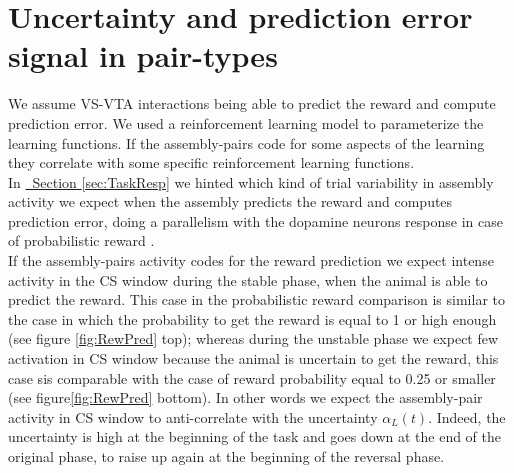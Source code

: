 \section{Uncertainty and prediction error signal in pair-types}
\label{sec:CorrRL}
We assume VS-VTA interactions being able to predict the reward and compute prediction error. We used a reinforcement learning model to parameterize the learning functions. If the assembly-pairs code for some aspects of the learning they correlate with some specific reinforcement learning functions.\\
In \hyperref[sec:TaskResp]{~Section \ref*{sec:TaskResp}} we hinted which kind of trial variability in assembly activity we expect when the assembly predicts the reward and computes prediction error, doing a parallelism with the dopamine neurons response in case of probabilistic reward \cite{Fiorillo}.\\
If the assembly-pairs activity codes for the reward prediction we expect intense activity in the CS window during the stable phase, when the animal is able to predict the reward. This case in the probabilistic reward comparison is similar to the case in which the probability to get the reward is equal to 1 or high enough (see figure \ref{fig:RewPred} top); whereas during the unstable phase we expect few activation in CS window because the animal is uncertain to get the reward, this case sis comparable with the case of reward probability equal to 0.25 or smaller (see figure\ref{fig:RewPred} bottom). In other words we expect the assembly-pair activity in CS window to anti-correlate with the uncertainty $\alpha_L(t)$. Indeed, the uncertainty is high at the beginning of the task and goes down at the end of the original phase, to raise up again at the beginning of the reversal phase. 
